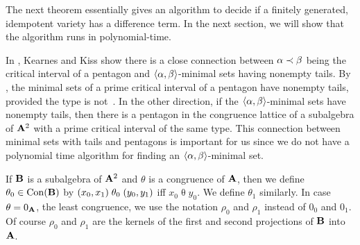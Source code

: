 \documentclass{ws-ijac}
\begin{document}
The next theorem essentially gives an algorithm to decide if a finitely
generated, idempotent variety has a difference term. In the next
section, we will show that the algorithm runs in polynomial-time.

In \cite{KearnesKiss1999}, Kearnes and Kiss show there is a close connection
between $\alpha \prec \beta$ being the critical interval of
a pentagon and $\langle \alpha,\beta\rangle$-minimal sets
having nonempty tails.
By \cite[Theorem 2.1]{KearnesKiss1999}, the minimal sets
of a prime critical interval of a pentagon have nonempty tails, provided
the type is not~\utyp. In the other direction, if the
$\langle \alpha,\beta\rangle$-minimal sets have nonempty tails,
then there is a pentagon in the congruence lattice of a subalgebra of
$\mathbf{A}^2$ with a prime critical interval of the same type.
This connection between minimal sets with tails and
pentagons is important for us since we do not have a polynomial time algorithm
for finding an $\langle \alpha,\beta\rangle$-minimal set.

If $\mathbf{B}$ is a subalgebra of $\mathbf{A}^2$ and $\theta$ is a congruence
of $\mathbf{A}$, then we define $\theta_{0} \in \operatorname{Con} (\mathbf{B})$ by
$(x_0,x_1) \mathrel{\theta_{0}} (y_0,y_1)$ iff
$x_0 \mathrel{\theta} y_0$. We define $\theta_1$ similarly.
In case $\theta = 0_{\mathbf{A}}$, the least congruence,
we use the notation $\rho_0$ and $\rho_1$ instead of
$0_0$ and $0_1$. Of course $\rho_0$ and $\rho_1$ are the kernels
of the first and second projections of $\mathbf{B}$ into~$\mathbf{A}$.
\end{document}
